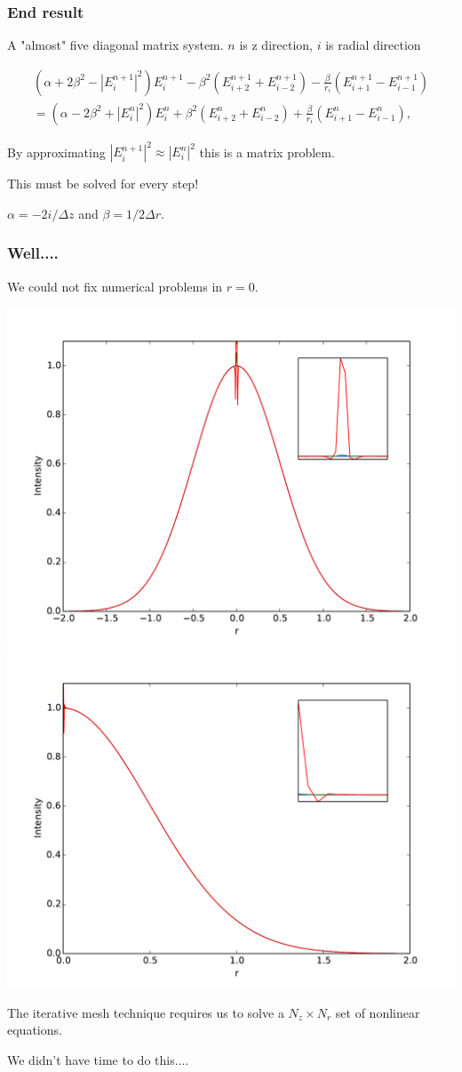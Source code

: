 \begin{frame}
  \frametitle{End result}
  A "almost" five diagonal matrix system.
  $n$ is z direction, $i$ is radial direction
  
  \begin{align*}
    (\alpha + 2\beta^{2} - |E_{i}^{n+1}|^{2})E_{i}^{n+1} - \beta^{2}(E_{i+2}^{n+1} + E_{i-2}^{n+1}) -
    \frac{\beta}{r_{i}} (E_{i+1}^{n+1} - E_{i-1}^{n+1}) \\
    = (\alpha - 2\beta^{2} + |E_{i}^{n}|^{2})E_{i}^{n} + \beta^{2}(E_{i+2}^{n} + E_{i-2}^{n}) +
    \frac{\beta}{r_{i}} (E_{i+1}^{n} - E_{i-1}^{n}),
  \end{align*}


  By approximating $|E_{i}^{n+1}|^{2} \approx |E_{i}^{n}|^{2}$ this is a matrix problem.

  This must be solved for every step!


  \vfill
  $\alpha = -2i/\!{\Delta z}$ and $\beta = 1/{2 \Delta r}$.

\end{frame}

\begin{frame}
  \frametitle{Well....}
  We could not fix numerical problems in $r = 0$. \bigskip

  \includegraphics[width=0.45\columnwidth]{kerr_double} \hfill \includegraphics[width=0.45\columnwidth]{kerr_single}

  The iterative mesh technique requires us to solve a $N_{z} \times N_{r}$ set of nonlinear
  equations.

  We didn't have time to do this....
\end{frame}
